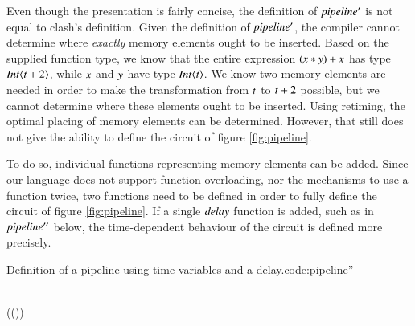 Even though the presentation is fairly concise, the definition of \ensuremath{\Varid{pipeline'}} is not equal to \gls{clash}'s definition.
Given the definition of \ensuremath{\Varid{pipeline'}}, the compiler cannot determine where \textit{exactly} memory elements ought to be inserted.
Based on the supplied function type, we know that the entire expression \ensuremath{(\Varid{x}\mathbin{*}\Varid{y})\mathbin{+}\Varid{x}} has type \ensuremath{\Conid{Int}\langle\Varid{t}\mathbin{+}\mathrm{2}\rangle}, while \ensuremath{\Varid{x}} and \ensuremath{\Varid{y}} have type \ensuremath{\Conid{Int}\langle\Varid{t}\rangle}.
We know two memory elements are needed in order to make the transformation from \ensuremath{\Varid{t}} to \ensuremath{\Varid{t}\mathbin{+}\mathrm{2}} possible, but we cannot determine where these elements ought to be inserted.
Using retiming\cite{leiserson1981optimizing}, the optimal placing of memory elements can be determined.
However, that still does not give the ability to define the circuit of figure \ref{fig:pipeline}.

To do so, individual functions representing memory elements can be added.
Since our language does not support function overloading, nor the mechanisms to use a function twice, two functions need to be defined in order to fully define the circuit of figure \ref{fig:pipeline}.
If a single \ensuremath{\Varid{delay}} function is added, such as in \ensuremath{\Varid{pipeline''}} below, the time-dependent behaviour of the circuit is defined more precisely.

\begin{texexptitled}{Definition of a pipeline using time variables and a delay.}{code:pipeline''}\begin{hscode}\SaveRestoreHook
{}%
%
%
\>[3]{}\mathbin{::}\langle{}\rangle\to {}\langle{}\rangle\to {}\langle{}\mathbin{+}\rangle{}\<[E]%
\\
\>[3]{}\;\;\mathrel{=}((\;)\mathbin{*})\mathbin{+}\<[E]%
\\[\blanklineskip]%
\>[3]{}\mathbin{::}\langle{}\rangle\to {}\langle{}\mathbin{+}\rangle{}\<[E]%
\\
\>[3]{}\;\mathrel{=}\<[E]%
\ColumnHook
\end{hscode}\resethooks
\end{texexptitled}

